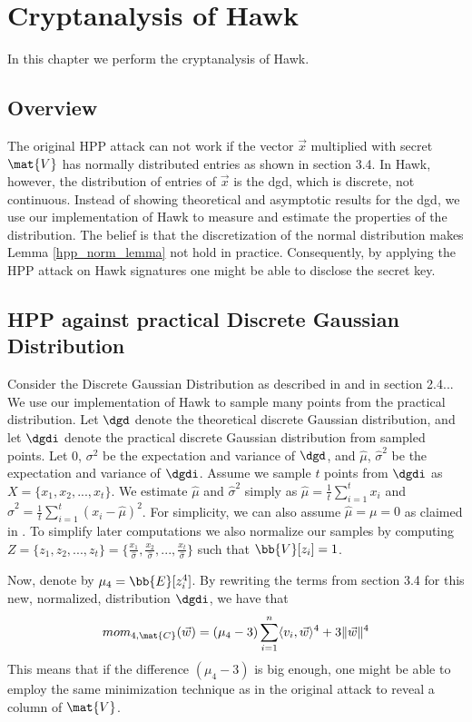 \chapter{Cryptanalysis of Hawk}
In this chapter we perform the cryptanalysis of Hawk.
\section{Overview}


The original HPP attack can not work if the vector $\vec{x}$ multiplied with secret $\mat{V}$ has normally distributed entries as shown in section 3.4.
In Hawk, however, the distribution of entries of $\vec{x}$ is the \gls{dgd}, which is discrete, not continuous. 
Instead of showing theoretical and asymptotic results for the \gls{dgd}, we use our implementation of Hawk to measure and estimate the properties of the distribution.
The belief is that the discretization of the normal distribution makes Lemma \ref{hpp_norm_lemma} not hold in practice. 
Consequently, by applying the HPP attack on Hawk signatures one might be able to disclose the secret key.

\section{HPP against practical Discrete Gaussian Distribution}
Consider the Discrete Gaussian Distribution as described in \cite{HawkSpec24} and in section 2.4... We use our implementation of Hawk to sample many points from the practical distribution.
Let $\dgd$ denote the theoretical discrete Gaussian distribution, and let $\dgdi$ denote the practical discrete Gaussian distribution from sampled points.
Let $0$, $\sigma^2$ be the expectation and variance of $\dgd$, and $\hat{\mu}$, $\hat{\sigma}^2$ be the expectation and variance of $\dgdi$.
Assume we sample $t$ points from $\dgdi$ as $X = \{x_1, x_2, ..., x_t\}$. We estimate $\hat{\mu}$ and $\hat{\sigma}^2$ simply as $\hat{\mu} = \frac{1}{t} \sum_{i=1}^{t} x_i$ and $\hat{\sigma}^2 = \frac{1}{t} \sum_{i=1}^{t}(x_i - \hat{\mu})^2$.
For simplicity, we can also assume $\hat{\mu} = \mu = 0$ as claimed in \cite{HawkSpec24}.
To simplify later computations we also normalize our samples by computing $Z = \{z_1, z_2, ..., z_t\} = \{\frac{x_1}{\hat{\sigma}}, \frac{x_2}{\hat{\sigma}},..., \frac{x_t}{\hat{\sigma}}\}$ such that 
$\bb{V}[z_i] = 1$.

Now, denote by $\mu_4 = \bb{E}[z_i^4]$. By rewriting the terms from section 3.4 for this new, normalized, distribution $\dgdi$, we have that
\[mom_{4, \mat{C}} (\vec{w}) = (\mu_4 - 3) \sum_{i=1}^{n} \langle v_i, \vec{w} \rangle^4 + 3 \lVert \vec{w} \rVert ^4 \]
This means that if the difference $(\mu_4 - 3)$ is big enough, one might be able to employ the same minimization technique as in the original attack to reveal a column of $\mat{V}$.
